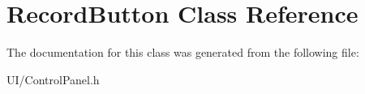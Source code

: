 \hypertarget{classRecordButton}{\section{Record\-Button Class Reference}
\label{classRecordButton}
}


The documentation for this class was generated from the following file\-:\begin{DoxyCompactItemize}
\item 
U\-I/Control\-Panel.\-h\end{DoxyCompactItemize}
